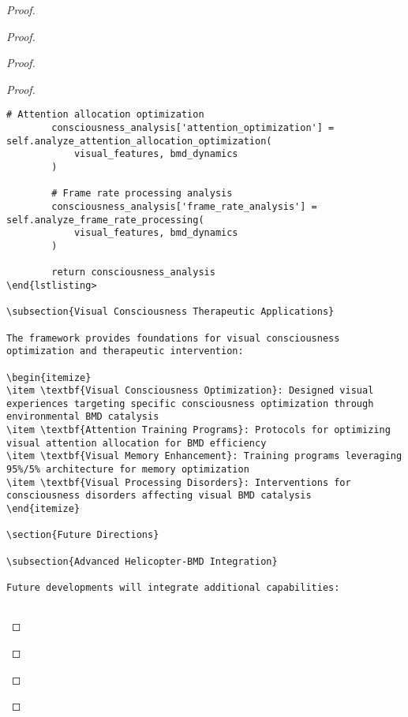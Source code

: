 \documentclass[12pt,a4paper]{article}
\begin{document}
\begin{proof}
{\begin{proof}
\begin{proof}
\begin{proof}
\begin{lstlisting}[style=pythonstyle, caption=Visual Memory BMD Integration]
        # Attention allocation optimization
        consciousness_analysis['attention_optimization'] = self.analyze_attention_allocation_optimization(
            visual_features, bmd_dynamics
        )
        
        # Frame rate processing analysis
        consciousness_analysis['frame_rate_analysis'] = self.analyze_frame_rate_processing(
            visual_features, bmd_dynamics
        )
        
        return consciousness_analysis
\end{lstlisting>

\subsection{Visual Consciousness Therapeutic Applications}

The framework provides foundations for visual consciousness optimization and therapeutic intervention:

\begin{itemize}
\item \textbf{Visual Consciousness Optimization}: Designed visual experiences targeting specific consciousness optimization through environmental BMD catalysis
\item \textbf{Attention Training Programs}: Protocols for optimizing visual attention allocation for BMD efficiency
\item \textbf{Visual Memory Enhancement}: Training programs leveraging 95%/5% architecture for memory optimization
\item \textbf{Visual Processing Disorders}: Interventions for consciousness disorders affecting visual BMD catalysis
\end{itemize}

\section{Future Directions}

\subsection{Advanced Helicopter-BMD Integration}

Future developments will integrate additional capabilities:


\end{lstlisting}
\end{proof}
\end{proof}
\end{proof}}
\end{proof}
\end{document}
